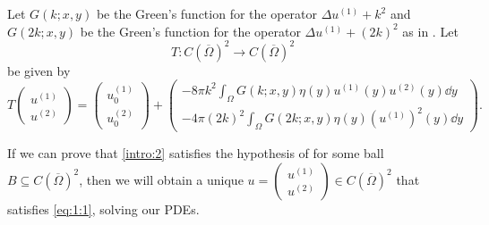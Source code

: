 \documentclass[a4paper, 12pt]{article}
\begin{document}
Let $G\left( k; x, y \right) $ be the Green's function for the operator $\Delta u^{(1)} + k^2$
and
$G\left( 2k; x, y \right) $ be the Green's function for the operator $\Delta u^{(1)} + \left( 2k \right)^2$ as in .
Let
\[
	T\colon C\left( \overline{\Omega} \right)^2\to C\left( \overline{\Omega} \right)^2
\]
be given by
\begin{equation}\label{intro:2}
T\begin{pmatrix} u^{(1)}\\u^{(2)} \end{pmatrix}  = \begin{pmatrix} u_0^{(1)}\\u_0^{(2)} \end{pmatrix} +
\begin{pmatrix}
	-8\pi k^2 \int_{\Omega}^{} G\left(k; x,y \right) \eta\left( y \right) u^{(1)}\left( y \right) u^{(2)}\left( y \right)\dd{y}\\
	-4 \pi \left( 2k \right) ^2\int_{\Omega}^{} G\left( 2k; x,y \right) \eta\left( y \right) \left(u^{(1)}\right)^2\left( y \right)\dd{y}
\end{pmatrix}
.\end{equation}

If we can prove that \cref{intro:2} satisfies the hypothesis of  for some ball $B \subseteq C\left( \overline{\Omega} \right)^2$, then we will obtain a unique
$u= \begin{pmatrix} u^{(1)}\\u^{(2)} \end{pmatrix} \in C\left( \overline{\Omega} \right)^2$ that satisfies \cref{eq:1:1}, solving our PDEs.
\end{document}
